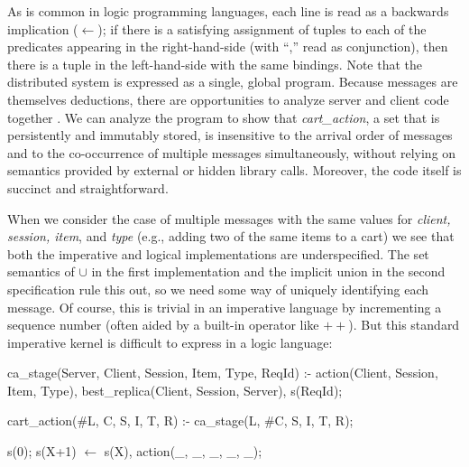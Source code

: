 As is common in logic programming languages, each line is read as a backwards
implication ($\leftarrow$); if there is a satisfying assignment of tuples to each of
the predicates appearing in the right-hand-side (with ``,'' read as conjunction), 
then there is a tuple in the left-hand-side with the same bindings.
Note that the distributed system is expressed as a single, global program.
Because messages are themselves deductions, there are opportunities to 
analyze server and client code together .  We can analyze the program to 
show that {\em cart\_action}, a set that is persistently and immutably
stored, is insensitive to the arrival order of messages 
and to the co-occurrence of multiple messages simultaneously, without relying
on semantics provided by external or hidden library calls.   Moreover, the code 
itself is succinct and straightforward. 




When we consider the case of multiple messages with the same values for
{\em client, session, item}, and {\em type} (e.g., adding two of the same items to a cart)
we see that both the imperative and logical implementations are underspecified.
The set semantics of $\cup$ in the first implementation and the implicit union 
in the second specification rule this out, so we need some way of uniquely identifying each message.
Of course, this is trivial in an imperative language by incrementing a sequence number (often aided by a built-in operator like $++$).
But this standard imperative kernel is difficult to express in a logic language:

\begin{Dedalus}
ca_stage(Server, Client, Session, Item, Type, ReqId) :-
  action(Client, Session, Item, Type),
  best_replica(Client, Session, Server),
  s(ReqId);

cart_action(#L, C, S, I, T, R) :-
  ca_stage(L, #C, S, I, T, R);

s(0);
s(X+1) \(\leftarrow\)  s(X), action(_, _, _, _, _);
\end{Dedalus}

